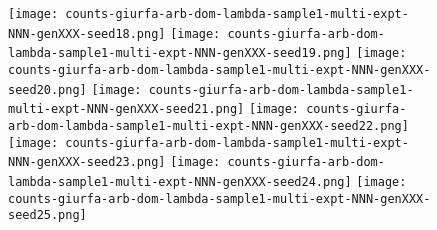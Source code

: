 \documentclass[12pt]{article}
\begin{document}
\begin{figure}
  \texttt{[image: counts-giurfa-arb-dom-lambda-sample1-multi-expt-NNN-genXXX-seed18.png]}\hspace{-7mm}
  \texttt{[image: counts-giurfa-arb-dom-lambda-sample1-multi-expt-NNN-genXXX-seed19.png]}\hspace{-7mm}
  \texttt{[image: counts-giurfa-arb-dom-lambda-sample1-multi-expt-NNN-genXXX-seed20.png]}
%
  \texttt{[image: counts-giurfa-arb-dom-lambda-sample1-multi-expt-NNN-genXXX-seed21.png]}\hspace{-7mm}
  \texttt{[image: counts-giurfa-arb-dom-lambda-sample1-multi-expt-NNN-genXXX-seed22.png]}\hspace{-7mm}
  \texttt{[image: counts-giurfa-arb-dom-lambda-sample1-multi-expt-NNN-genXXX-seed23.png]}\hspace{-7mm}
  \texttt{[image: counts-giurfa-arb-dom-lambda-sample1-multi-expt-NNN-genXXX-seed24.png]}\hspace{-7mm}
  \texttt{[image: counts-giurfa-arb-dom-lambda-sample1-multi-expt-NNN-genXXX-seed25.png]}
%
\end{figure}
\end{document}
